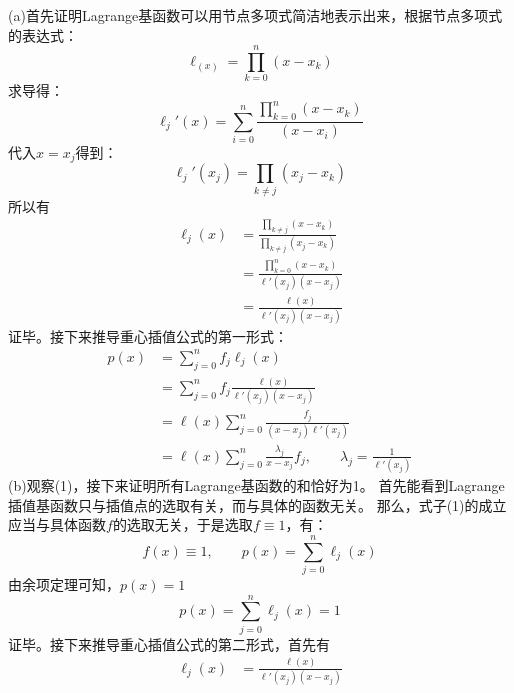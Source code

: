 \documentclass[12pt,a4paper,utf8]{ctexart}
\begin{document}
\begin{enumerate}
(a)首先证明Lagrange基函数可以用节点多项式简洁地表示出来，根据节点多项式的表达式：
\begin{equation}
\ell_(x) = \prod_{k=0}^{n} (x-x_{k}) \nonumber
\end{equation}
求导得：
\begin{equation}
\ell_j'(x) = \sum_{i=0}^n \frac{\prod_{k=0}^n (x-x_k)}{(x-x_i)} \nonumber
\end{equation}
代入$x=x_{j}$得到：
\begin{equation}
\ell_j'(x_j) =  \prod_{k \neq j}\left(x_j-x_k\right) \nonumber
\end{equation}
所以有
\begin{equation}
   \begin{aligned}
   \ell_j(x) &= \frac{\prod_{k \neq j}\left(x-x_k\right)}{\prod_{k \neq j}\left(x_j-x_k\right)} \\
   &= \frac{\prod_{k=0}^n (x-x_k)}{\ell'(x_j) (x-x_j)} \\
   &= \frac{\ell (x)}{\ell'(x_j) (x-x_j)} \nonumber
   \end{aligned}
\end{equation}
证毕。接下来推导重心插值公式的第一形式：
\begin{equation}
   \begin{aligned}
   p(x) &= \sum_{j=0}^n f_j \ell_j(x) \\ \nonumber
   &= \sum_{j=0}^n f_j \frac{\ell (x)}{\ell'(x_j) (x-x_j)} \\ \nonumber
   &= \ell (x) \sum_{j=0}^n \frac{f_j}{(x-x_j)\ell '(x_j)} \\ \nonumber
   &= \ell (x) \sum_{j=0}^n \frac{\lambda_j}{x-x_j} f_j,\qquad \lambda_j = \frac{1}{\ell '(x_j)} \nonumber
   \end{aligned}
\end{equation}
(b)观察(1)，接下来证明所有Lagrange基函数的和恰好为1。
首先能看到Lagrange插值基函数只与插值点的选取有关，而与具体的函数无关。
那么，式子(1)的成立应当与具体函数$f$的选取无关，于是选取$f\equiv 1$，有：
\begin{equation}
f(x)\equiv 1,\qquad p(x) = \sum_{j=0}^n\ell_j(x) \nonumber
\end{equation}
由余项定理可知，$p(x) = 1$
\begin{equation}
p(x) = \sum_{j=0}^n\ell_j(x)  = 1 \nonumber
\end{equation}
证毕。接下来推导重心插值公式的第二形式，首先有
\begin{equation}
   \begin{aligned}
      \ell_j(x)&= \frac{\ell (x)}{\ell'(x_j) (x-x_j)} \\ \nonumber

\end{aligned}
\end{equation}
\end{enumerate}
\end{document}

